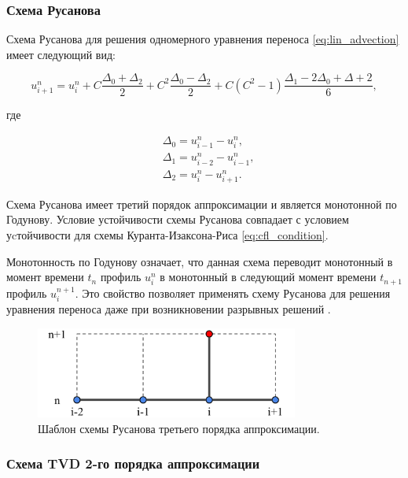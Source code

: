 \subsubsection{Схема Русанова}

Схема Русанова \cite{kholodov} для решения одномерного уравнения переноса \eqref{eq:lin_advection} имеет следующий вид:

\begin{equation}
    u_{i+1}^n = u_i^n + C\frac{\Delta_0 + \Delta_2}{2} + C^2 \dfrac{\Delta_0 - \Delta_2}{2} + C\left(C^2 - 1\right) \dfrac{\Delta_1 - 2\Delta_0 + \Delta+2}{6},
    \label{eq:rusanov}
\end{equation}

\noindent где

\begin{align*}
    & \Delta_0 = u_{i-1}^n - u_i^n, \\
    & \Delta_1 = u_{i-2}^n - u_{i-1}^n, \\
    & \Delta_2 = u_{i}^n - u_{i+1}^n .
\end{align*}

\noindent Схема Русанова имеет третий порядок аппроксимации и является монотонной по Годунову. Условие устойчивости схемы Русанова совпадает с условием уcтойчивости для схемы Куранта-Изаксона-Риса \eqref{eq:cfl_condition}.

Монотонность по Годунову означает, что данная схема переводит монотонный в момент времени $t_n$ профиль $u_i^n$ в монотонный в следующий момент времени $t_{n+1}$ профиль $u_i^{n+1}$. Это свойство позволяет применять схему Русанова для решения уравнения переноса даже при возникновении разрывных решений \cite{kholodov}.

\begin{figure}[!htb]
    \centering
    \includegraphics[height=3cm]{images/theory/scheme_rusanov.png}
    \caption{Шаблон схемы Русанова третьего порядка аппроксимации.}
    \label{fig:scheme_rusanov}
\end{figure}

\subsubsection{Схема TVD 2-го порядка аппроксимации}

